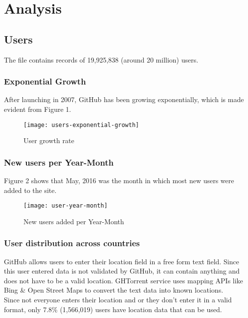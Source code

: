 \newpage

\section{Analysis}

\subsection{Users}

The  file contains records of 19,925,838 (around 20 million) users.

\subsubsection{Exponential Growth}

After launching in 2007, GitHub has been growing exponentially, which is made evident from Figure 1.

\begin{figure}[htb]
\centering
\texttt{[image: users-exponential-growth]}
\caption{User growth rate}
\end{figure}


\subsubsection{New users per Year-Month}

Figure 2 shows that May, 2016 was the month in which most new users were added to the site.

\begin{figure}[htb]
\centering
\texttt{[image: user-year-month]}
\caption{New users added per Year-Month}
\end{figure}

\subsubsection{User distribution across countries}

GitHub allows users to enter their location field in a free form text field.
Since this user entered data is not validated by GitHub, it can contain anything and does not have to be a valid location.
GHTorrent service uses mapping APIs like Bing \& Open Street Maps to convert the text data into known locations. \\

Since not everyone enters their location and or they don't enter it in a valid format, only 7.8\% (1,566,019)
 users have location data that can be used. \\

